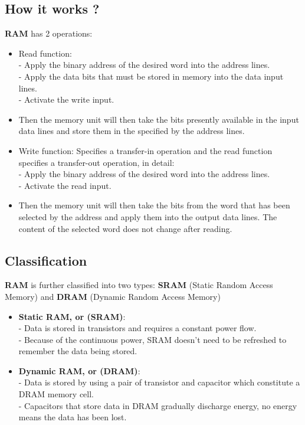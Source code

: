 \documentclass [12pt]{article}
\begin{document}
		\subsection{How it works ?}
			\textbf{RAM} has 2 operations:
				\begin{itemize}
					\item Read function: \\
					- Apply the binary address of the desired word into the address lines.\\
					- Apply the data bits that must be stored in memory into the data input lines.\\
					- Activate the write input.
					
					\item Then the memory unit will then take the bits presently available in the input data lines and store them in the specified by the address lines. 
					
					\item Write function: Specifies a transfer-in operation and the read function specifies a transfer-out operation, in detail: \\
					- Apply the binary address of the desired word into the address lines.\\
					- Activate the read input.
					
					\item Then the memory unit will then take the bits from the word that has been selected by the address and apply them into the output data lines. The content of the selected word does not change after reading.
					
					\end{itemize}

		\subsection {Classification}
		\textbf{RAM} is further classified into two types: \textbf{SRAM} (Static Random Access Memory) and \textbf{DRAM} (Dynamic Random Access Memory)

			\begin {itemize}
				\item \textbf{Static RAM, or (SRAM)}: \\
				- Data is stored in transistors and requires a constant power flow.\\
				- Because of the continuous power, SRAM doesn’t need to be refreshed to remember the data being stored.
				
				\item \textbf{Dynamic RAM, or (DRAM)}:\\
				- Data is stored by using a pair of transistor and capacitor which constitute a DRAM memory cell.\\
				- Capacitors that store data in DRAM gradually discharge energy, no energy means the data has been lost. \\
			\end {itemize}
\end{document}
